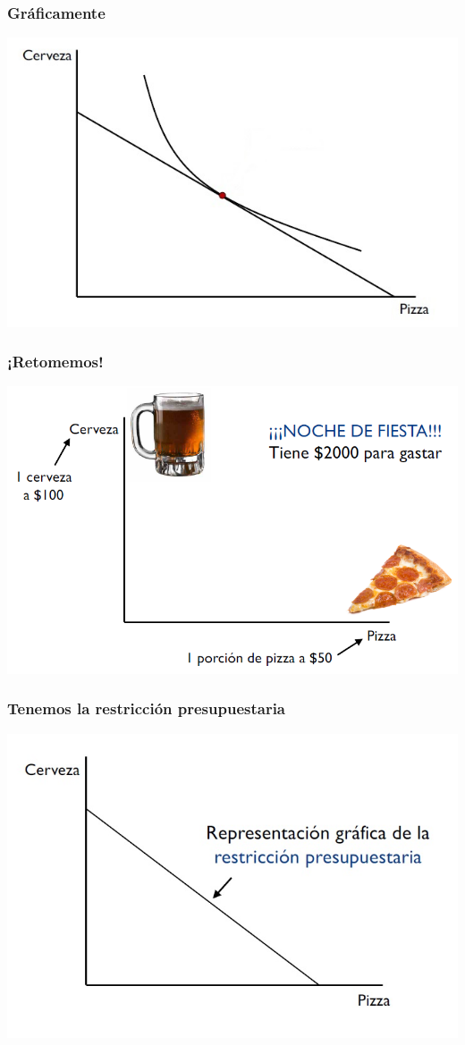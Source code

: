 \documentclass{beamer}
\begin{document}
\begin{frame}
\frametitle{Gráficamente}
\centering
\includegraphics[scale=0.65]{Figures/Tema_02.22_rp21.jpg}
\end{frame}


\begin{frame}
\frametitle{¡Retomemos!}
\centering
\includegraphics[scale=0.5]{Figures/Tema_02.2_rp.png}
\end{frame}

\begin{frame}
\frametitle{Tenemos la restricción presupuestaria}
\centering
\includegraphics[scale=0.6]{Figures/Tema_02.4_rp2.jpg}
\end{frame}
\end{document}
